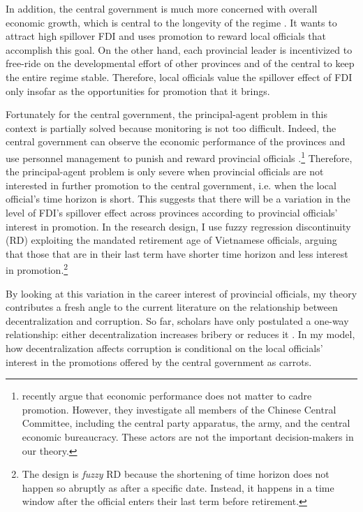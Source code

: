In addition, the central government is much more concerned with overall economic growth, which is central to the longevity of the regime \citep{Malesky2008}. It wants to attract high spillover FDI and uses promotion to reward local officials that accomplish this goal. On the other hand, each provincial leader is incentivized to free-ride on the developmental effort of other provinces and of the central to keep the entire regime stable. Therefore, local officials value the spillover effect of FDI only insofar as the opportunities for promotion that it brings.

Fortunately for the central government, the principal-agent problem in this context is partially solved because monitoring is not too difficult. Indeed, the central government can observe the economic performance of the provinces and use personnel management to punish and reward provincial officials \citep{Sheng2007, Li2005}.\footnote{\citet{Shih2012} recently argue that economic performance does not matter to cadre promotion. However, they investigate all members of the Chinese Central Committee, including the central party apparatus, the army, and the central economic bureaucracy. These actors are not the important decision-makers in our theory.} Therefore, the principal-agent problem is only severe when provincial officials are not interested in further promotion to the central government, i.e. when the local official's time horizon is short. This suggests that there will be a variation in the level of FDI's spillover effect across provinces according to provincial officials' interest in promotion. In the research design, I use fuzzy regression discontinuity (RD) exploiting the mandated retirement age of Vietnamese officials, arguing that those that are in their last term have shorter time horizon and less interest in promotion.\footnote{The design is \textit{fuzzy} RD because the shortening of time horizon does not happen so abruptly as after a specific date. Instead, it happens in a time window after the official enters their last term before retirement.}

By looking at this variation in the career interest of provincial officials, my theory contributes a fresh angle to the current literature on the relationship between decentralization and corruption. So far, scholars have only postulated a one-way relationship: either decentralization increases bribery \citep{Fan2009} or reduces it \citep{Guerra2009}. In my model, how decentralization affects corruption is conditional on the local officials' interest in the promotions offered by the central government as carrots.


